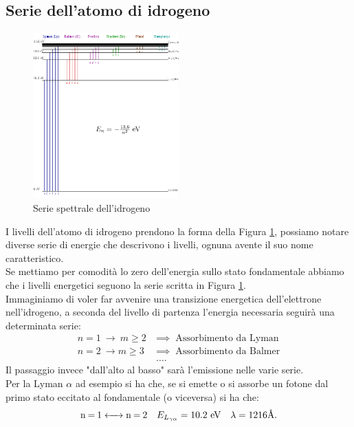 \subsection{Serie dell'atomo di idrogeno}%
\begin{figure}[H]
	\centering
	\includegraphics[width=0.5\textwidth]{figures/serie_idrogeno.png}
	\caption{\scriptsize Serie spettrale dell'idrogeno}
	\label{fig:-figures-serie_idrogeno-png}
\end{figure}
I livelli dell'atomo di idrogeno prendono la forma della Figura \ref{fig:-figures-serie_idrogeno-png}, possiamo notare diverse serie di energie che descrivono i livelli, ognuna avente il suo nome caratteristico.\\
Se mettiamo per comodità lo zero dell'energia sullo stato fondamentale abbiamo che i livelli energetici seguono la serie scritta in Figura \ref{fig:-figures-serie_idrogeno-png}.\\
Immaginiamo di voler far avvenire una transizione energetica dell'elettrone nell'idrogeno, a seconda del livello di partenza l'energia necessaria seguirà una determinata serie:
\begin{align}
	n=1 \ \to \ m \ge 2 \ &\implies \ \text{ Assorbimento da Lyman}\\
	n=2 \ \to m\ge 3 \ &\implies \ \text{ Assorbimento da Balmer} \\
			   &\ldots
.\end{align}
Il passaggio invece "dall'alto al basso" sarà l'emissione nelle varie serie.\\ 
Per la Lyman $\alpha $ ad esempio si ha che, se si emette o si assorbe un fotone dal primo stato eccitato al fondamentale (o viceversa) si ha che:
\begin{align}
	&\ce{n = 1 <-> n = 2 }  & E_{L_{\gamma \alpha }} = 10.2 \text{ eV}& &\lambda = 1216 \text{\AA}
.\end{align}
